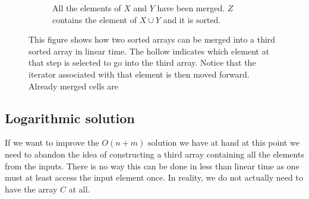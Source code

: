 \begin{figure}
\begin{subfigure}[b]{0.45\textwidth}
		\caption{All the elements of $X$ and $Y$ have been merged. $Z$ contains the element of $X \cup Y$ and it is sorted.}
		\label{fig:median_sorted_array:mergearray8}
	\end{subfigure}
	\caption[Example of merging two sorted arrays.]{This figure shows how two sorted arrays can be merged into a third sorted array in linear time. The hollow indicates which element at that step is selected to go into the third array. Notice that the iterator associated with that element is then moved forward. Already merged cells are }
	\label{fig:median_sorted_array:mergearray}
\end{figure}


\subsection{Logarithmic solution}
\label{median_sorted_arrays:sec:log}
If we want to improve the $O(n+m)$ solution we have at hand at this point we need to abandon the idea of constructing a third array containing all the elements from the inputs.
There is no way this can be done in less than linear time as one must at least access the input element once.
In reality,  we do not actually need to have the array $C$ at all. 

